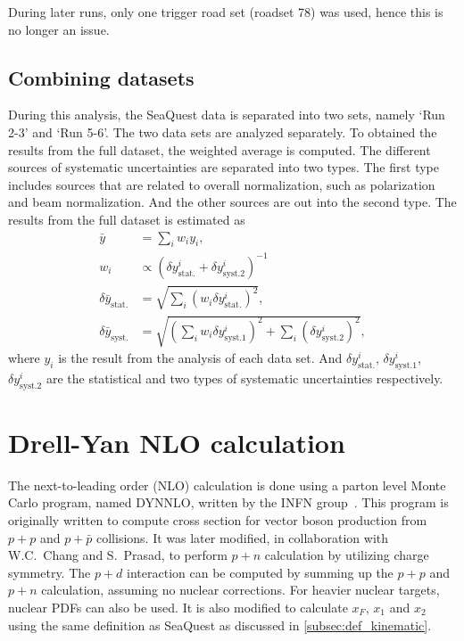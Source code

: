 \documentclass[../main.tex]{subfiles}
\begin{document}
During later runs, only one trigger road set (roadset 78) was used, hence this is no
longer an issue.

\subsection{Combining datasets}
\label{subsec:combine}
During this analysis, the SeaQuest data is separated into two sets, namely `Run 2-3' and `Run 5-6'.
The two data sets are analyzed separately. To obtained the results from the full dataset, the weighted
average is computed. The different sources of systematic uncertainties are separated into two types.
The first type includes sources that are related to overall normalization, such as polarization and beam
normalization. And the other sources are out into the second type. The results from the full dataset
is estimated as 
\begin{equation}
	\begin{split}
		\bar{y}&=\sum_i w_i y_i,\\
		w_i &\propto \left(\delta y^i_{\mathrm{stat.}}+\delta y^i_{\mathrm{syst. 2}}\right)^{-1}\\
		\delta\bar{y}_{\mathrm{stat.}}&=\sqrt{\sum_i \left(w_i \delta y^i_{\mathrm{stat.}}\right)^2},\\
		\delta\bar{y}_{\mathrm{syst.}}&=\sqrt{\left(\sum_i w_i \delta y^i_{\mathrm{syst. 1}}\right)^2+\sum_i \left(\delta y^i_{\mathrm{syst. 2}}\right)^2},
	\end{split}
\end{equation}
where $y_i$ is the result from the analysis of each data set.
And $\delta y^i_{\mathrm{stat.}}$, $\delta y^i_{\mathrm{syst. 1}}$, $\delta y^i_{\mathrm{syst. 2}}$
are the statistical and two types of systematic uncertainties respectively.

\section{Drell-Yan NLO calculation}
\label{sec:DYNNLO}
The next-to-leading order (NLO) calculation is done using a parton level Monte
Carlo program, named DYNNLO, written by the INFN group~\cite{catani2009,catani2007}. This program
is originally written to compute cross section for vector boson
production from $p+p$ and $p+\bar{p}$ collisions. It was later modified, in
collaboration with W.C.~Chang and S.~Prasad, to perform $p+n$ calculation
by utilizing charge symmetry. The $p+d$ interaction can be computed by summing up
the $p+p$ and $p+n$ calculation, assuming no nuclear corrections. For heavier nuclear
targets, nuclear PDFs can also be used. It is also modified to calculate $x_F$, $x_1$ and $x_2$
using the same definition as SeaQuest as discussed in \cref{subsec:def_kinematic}.
\end{document}
